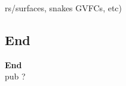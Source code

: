 \documentclass[9pt]{beamer}
\begin{document}
\begin{frame}
\begin{itemize}
rs/surfaces, snakes GVFCs, etc) 
\end{itemize}
\end{frame}
\subsection{End}
		\begin{frame}
				\begin{center}
				\textbf{End}\\
		
				{\tiny{pub ?}}
				\end{center}
			


	\end{frame}


	
	
\end{document}
